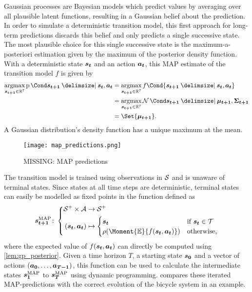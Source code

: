 Gaussian processes are Bayesian models which predict values by averaging over all plausible latent functions, resulting in a Gaussian belief about the prediction.
In order to simulate a deterministic transition model, this first approach for long-term predictions discards this belief and only predicts a single successive state.
The most plausible choice for this single successive state is the maximum-a-posteriori estimation given by the maximum of the posterior density function.
With a deterministic state $\bm{s_t}$ and an action $\bm{a_t}$, this MAP estimate of the transition model $f$ is given by
\begin{align}
    \argmax_{\mat{s_{t+1}} \in \R^7} \Prob{\mat{s_{t+1}} \given \mat{s_t}, \mat{a_t}} &= \argmax_{\mat{s_{t+1}} \in \R^7} f\Cond{\mat{s_{t+1}} \given \mat{s_t}, \mat{a_t}} \\
    &= \argmax_{\mat{s_{t+1}} \in \R^7} \Gaussian{\mat{s_{t+1}} \given \mat{\mu_{t+1}}, \mat{\Sigma_{t+1}}} \\
    &= \Set{\mat{\mu_{t+1}}}.
\end{align}
A Gaussian distribution's density function has a unique maximum at the mean.

\begin{figure}[t]
    \centering
    \texttt{[image: map\_predictions.png]}
    \caption{MISSING: MAP predictions}
    \label{fig:map_predictions}
\end{figure}
The transition model is trained using observations in $\mathcal{S}$ and is unaware of terminal states.
Since states at all time steps are deterministic, terminal states can easily be modelled as fixed points in the function defined as
\begin{align}
    \map{\mat{s_{t+1}}} \colon \left\{
        \begin{aligned}
            \Es^+ \times \Ah &\to \Es^+ \\
            (\mat{s_t}, \mat{a_t}) &\mapsto \begin{cases}
            \mat{s_t} & \text{if $\mat{s_t} \in \Tee$} \\
            \squeeze(\Moment{\E}{f(\mat{s_t}, \mat{a_t})}) & \text{otherwise,}
        \end{cases}
    \end{aligned}
    \right.
\end{align}
where the expected value of $f(\bm{s_t}, \bm{a_t})$ can directly be computed using \cref{lem:gp_posterior}.
Given a time horizon $T$, a starting state $\bm{s_0}$ and a vector of actions $(\bm{a_0}, \dots, \bm{a_{T-1}})$, this function can be used to calculate the intermediate states $\bm{s_1}^{\text{MAP}}$ to $\bm{s_T}^{\text{MAP}}$ using dynamic programming.
 compares these iterated MAP-predictions with the correct evolution of the bicycle system in an example.

